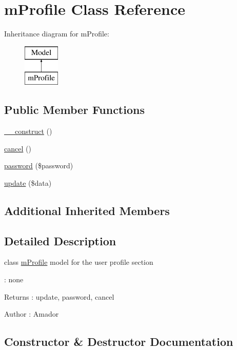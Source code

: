 \hypertarget{classmProfile}{}\section{m\+Profile Class Reference}
\label{classmProfile}
Inheritance diagram for m\+Profile\+:\begin{figure}[H]
\begin{center}
\leavevmode
\includegraphics[height=2.000000cm]{classmProfile}
\end{center}
\end{figure}
\subsection*{Public Member Functions}
\begin{DoxyCompactItemize}
\item 
\hyperlink{classmProfile_a5aa4d11d401e5f2b4c7e6654c4ea4c10}{\+\_\+\+\_\+construct} ()
\item 
\hyperlink{classmProfile_a8bd90cf55df0ae8ca253fa2d8011a8e8}{cancel} ()
\item 
\hyperlink{classmProfile_abe1a0a9fe693ded015211151102d14a0}{password} (\$password)
\item 
\hyperlink{classmProfile_a606d60c745fdb774786c536a65533552}{update} (\$data)
\end{DoxyCompactItemize}
\subsection*{Additional Inherited Members}


\subsection{Detailed Description}
class \hyperlink{classmProfile}{m\+Profile} model for the user profile section

\+: none \begin{DoxyReturn}{Returns}
\+: update, password, cancel 
\end{DoxyReturn}
\begin{DoxyAuthor}{Author}
\+: Amador 
\end{DoxyAuthor}


\subsection{Constructor \& Destructor Documentation}
\hypertarget{classmProfile_a5aa4d11d401e5f2b4c7e6654c4ea4c10}{}
